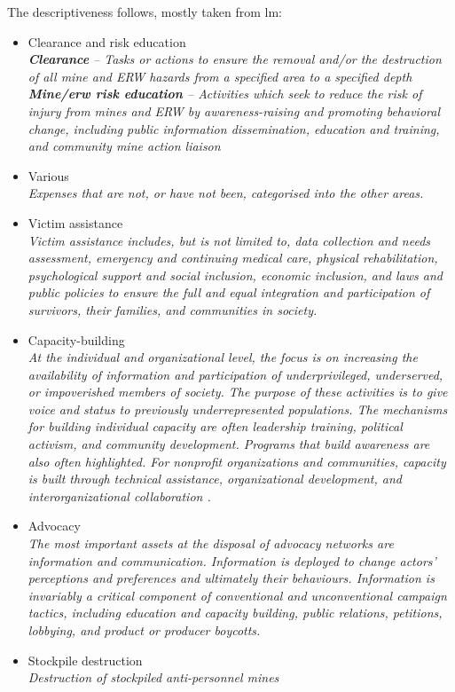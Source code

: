 The descriptiveness follows, mostly taken from \gls{lm}: 
\begin{itemize}
\setlength{\itemsep}{0.05\baselineskip}
    \item Clearance and risk education\\
    \textit{\textbf{Clearance} – Tasks or actions to ensure the removal and/or the destruction of all mine and ERW hazards from a specified area to a specified depth\\
    \textbf{Mine/\gls{erw} risk education} – Activities which seek to reduce the risk of injury from mines and  ERW by awareness-raising and  promoting behavioral  change, including public information dissemination, education and training, and community mine action liaison}
    \item Various\\
    \textit{Expenses that are not, or have not been, categorised into the other areas.}
    \item Victim assistance\\
    \textit{Victim assistance includes, but is not limited to, data collection and needs assessment, emergency and continuing medical care, physical rehabilitation, psychological support and social inclusion, economic inclusion, and laws and public policies to ensure the full and equal integration and participation of survivors, their families, and communities in society.}
    \item Capacity-building\\
    \textit{At the individual and organizational level, the focus is on increasing the availability of information and participation of underprivileged, underserved, or impoverished members of society. The purpose of these activities is to give voice and status to previously underrepresented populations. The mechanisms for building individual capacity are often leadership training, political activism, and community development. Programs that build awareness are also often highlighted. For nonprofit organizations and communities, capacity is built through technical assistance, organizational development, and interorganizational collaboration \cite{EB:capacity-building}.}
    \item Advocacy\\
    \textit{The most important assets at the disposal of advocacy networks are information and communication. Information is deployed to change actors’ perceptions and preferences and ultimately their behaviours. Information is invariably a critical component of conventional and unconventional campaign tactics, including education and capacity building, public relations, petitions, lobbying, and product or producer boycotts\cite{EB:advocacy-networking}.}
    \item Stockpile destruction\\
    \textit{Destruction of stockpiled anti-personnel mines}
\end{itemize}